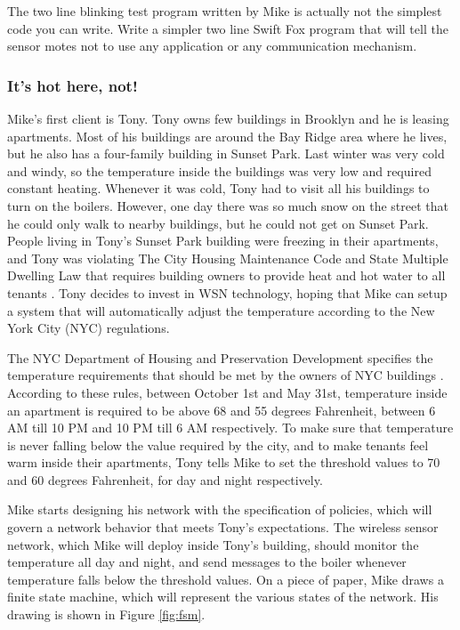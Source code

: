 The two line blinking test program written by Mike is actually not 
the simplest code you can write. Write a simpler two line Swift Fox 
program that will tell the sensor motes not to use any application 
or any communication mechanism.


\subsubsection{It's hot here, not!}

Mike's first client is Tony. Tony owns few buildings in Brooklyn and he is 
leasing apartments. Most of his buildings are around the Bay Ridge area
where he lives, but he also has a four-family building in Sunset Park. Last
winter was very cold and windy, so the temperature inside the buildings was
very low and required constant heating. Whenever it was cold, Tony had to
visit all his buildings to turn on the boilers. However, one day there was 
so much snow on the street that he could only walk to nearby buildings, but
he could not get on Sunset Park. People living in Tony's Sunset Park
building were freezing in their apartments, and Tony was violating The City
Housing Maintenance Code and State Multiple Dwelling Law that requires
building owners to provide heat and hot water to all tenants
\cite{nyc-dhpd:online}. Tony decides to invest in WSN technology, hoping
that Mike can setup a system that will automatically adjust the temperature
according to the New York City (NYC) regulations.

The NYC Department of Housing and Preservation Development specifies the
temperature requirements that should be met by the owners of NYC buildings 
\cite{nyc-dhpd:online}. According to these rules, between October 1st and
May 31st, temperature inside an apartment is required to be above 68 and 55
degrees Fahrenheit, between 6 AM till 10 PM and 10 PM till 6 AM
respectively. To make sure that temperature is never falling below the
value required by the city, and to make tenants feel warm inside their
apartments, Tony tells Mike to set the threshold values to 70 and 60
degrees Fahrenheit, for day and night respectively.

Mike starts designing his network with the specification of policies, which
will govern a network behavior that meets Tony's expectations. The wireless
sensor network, which Mike will deploy inside Tony's building, should
monitor the temperature all day and night, and send messages to the
boiler whenever temperature falls below the threshold values. On a piece of
paper, Mike draws a finite state machine, which will represent the various 
states of the network. His drawing is shown in Figure \ref{fig:fsm}.

